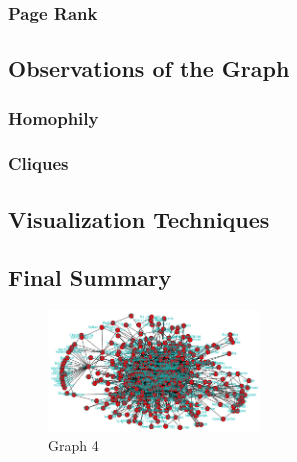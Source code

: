 \documentclass[12pt, oneside]{article}
\begin{document}
\subsubsection{Page Rank}

\subsection{Observations of the Graph}

\subsubsection{Homophily}

\subsubsection{Cliques}

\subsection{Visualization Techniques}

\subsection{Final Summary}

\begin{figure}[H]
	\centering
	\includegraphics[width=0.5\textwidth]{./Pictures/graph4.png}
	\caption{Graph 4}
\end{figure}




%
\end{document}
